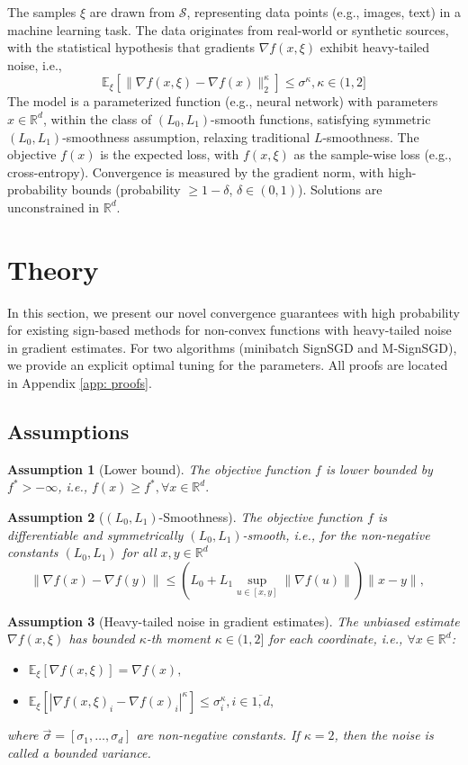 \documentclass[12pt]{article}
\newcommand{\EE}{\mathbb{E}}
\newcommand{\R}{\mathbb{R}}
\newtheorem{assumption}{Assumption}
\begin{document}
The samples $\xi$ are drawn from $\mathcal{S}$, representing data points (e.g., images, text) in a machine learning task. The data originates from real-world or synthetic sources, with the statistical hypothesis that gradients $\nabla f(x, \xi)$ exhibit heavy-tailed noise, i.e., 
\[
\mathbb{E}_{\xi} [\|\nabla f(x, \xi) - \nabla f(x)\|_2^\kappa] \leq \sigma^\kappa ,  \kappa \in (1,2]
\]
The model is a parameterized function (e.g., neural network) with parameters $x \in \mathbb{R}^d$, within the class of $(L_0, L_1)$-smooth functions, satisfying symmetric $(L_0, L_1)$-smoothness assumption, relaxing traditional $L$-smoothness. The objective $f(x)$ is the expected loss, with $f(x, \xi)$ as the sample-wise loss (e.g., cross-entropy). Convergence is measured by the gradient norm, with high-probability bounds (probability $\geq 1 - \delta$, $\delta \in (0,1)$). Solutions are unconstrained in $\mathbb{R}^d$.


\section{Theory}

In this section, we present our novel convergence guarantees with high probability for existing sign-based methods for non-convex functions with heavy-tailed noise in gradient estimates. For two algorithms (minibatch SignSGD and M-SignSGD), we provide an explicit optimal tuning for the parameters. All proofs are located in Appendix \ref{app: proofs}.

\subsection{Assumptions}
 
\begin{assumption}[Lower bound]\label{as: bounded}
    The objective function $f$ is lower bounded by $f^* > -\infty$, i.e., $f(x) \geq f^*, \forall x \in \R^d.$
\end{assumption}
\begin{assumption}[$(L_0, L_1)$-Smoothness]\label{as: smooth}
    The objective function $f$ is differentiable and symmetrically $(L_0, L_1)$-smooth, i.e., for the non-negative constants $(L_0, L_1)$ for all $x, y \in \R^d$
    $$
\|\nabla f(x) - \nabla f(y)\| \leq \left(L_0 + L_1  \sup_{u \in \left[x, y \right]}\|\nabla f(u)\|\right) \|x - y\|, 
\quad $$
\end{assumption}
\begin{assumption}[Heavy-tailed noise in gradient estimates]\label{as: pBCM}
    The unbiased estimate $\nabla f (x, \xi)$  has bounded $\kappa$-th moment $\kappa \in (1,2]$ for each coordinate, i.e., $\forall x \in \R^d$: 
    \begin{itemize}
        \item $\EE_\xi [\nabla f (x, \xi)] = \nabla f(x),$
        \item $\EE_\xi [|\nabla f (x, \xi)_i - \nabla f(x)_i|^\kappa] \leq \sigma_i^\kappa, i \in \overline{1,d},$
    \end{itemize}
    where $\Vec{\sigma} = [\sigma_1, \dots, \sigma_d]$ are non-negative constants.
    If $\kappa = 2$, then the noise is called a bounded variance. 
\end{assumption}
\end{document}
